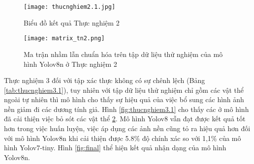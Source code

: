 \documentclass[../the.tex]{subfiles}
\begin{document}
\begin{figure}[H]
    \centering
    \texttt{[image: thucnghiem2.1.jpg]}
    \caption{Biểu đồ kết quả Thực nghiệm 2}
    \label{fig:thucnghiem2}
\end{figure}

\begin{figure}[H]
    \centering
    \texttt{[image: matrix\_tn2.png]}
    \caption{Ma trận nhầm lẫn chuẩn hóa trên tập dữ liệu thử nghiệm của mô hình Yolov8n ở Thực nghiệm 2}
    \label{fig:thucnghiem2.1}
\end{figure}

{\fontsize{13}{12} \selectfont
Thực nghiệm 3 đối với tập xác thực không có sự chênh lệch (Bảng \ref{tab:thucnghiem3.1}), tuy nhiên với tập dữ liệu thử nghiệm chỉ gồm các vật thể ngoài tự nhiên thì mô hình
cho thấy sự hiệu quả của việc bổ sung các hình ảnh nền giảm đi các dương tính giả. Hình \ref{fig:thucnghiem3.1} cho thấy các ở mô hình đã cải thiện việc bỏ sót các vật thể \ref{fig:thucnghiem2.1}.
Mô hình Yolov8 vẫn đạt được kết quả tốt hơn trong việc huấn luyện, việc áp dụng các ảnh nền cũng tỏ ra hiệu quả hơn đối với mô hình Yolov8n khi cải thiện được 5.8\% độ chính xác so với 1,1\% của mô hình Yolov7-tiny.
Hình \ref{fig:final} thể hiện kết quả nhận dạng của mô hình Yolov8n.
}
\end{document}
